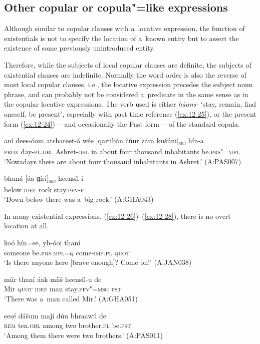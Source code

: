 \subsection{Other copular or copula"=like expressions}
\label{subsec:12-1-4}

 Although similar to copular clauses with a~locative expression, the function of existentials is not to specify the location of a~known entity but to assert the existence of some previously unintroduced entity. 


Therefore, while the subjects of local copular clauses are definite, the subjects of existential clauses are indefinite. Normally the word order is also the reverse of most local copular clauses, i.e., the locative expression precedes the subject noun phrase, and can probably not be considered a~predicate in the same sense as in the copular locative expressions. The verb used is either \textit{háans-} `stay, remain, find oneself, be present', especially with past time reference (\ref{ex:12-25}), or the present form (\ref{ex:12-24})~-- and occasionally the Past form~-- of the standard copula.

\begin{exe}
\ex
\label{ex:12-24}
\gll aní dees-óom atshareet-á wée [qariibán čúur zára kušúni]\textsubscript{\textsc{sbj}} hín-a \\
\textsc{prox} day-\textsc{pl.obl} Ashret-\textsc{obl} in about  four thousand inhabitants be.\textsc{prs"=mpl}\\
\glt `Nowadays there are about four thousand inhabitants in Ashret.' (A:PAS007)

\ex
\label{ex:12-25}
\gll bhuná [áa ɡíri]\textsubscript{\textsc{sbj}} heensíl-i \\
below \textsc{idef} rock stay.\textsc{pfv-f} \\
\glt `Down below there was a~big rock.' (A:GHA043)
\end{exe}

In many existential expressions, (\ref{ex:12-26})--(\ref{ex:12-28}), there is no overt location at all.

\begin{exe}
\ex
\label{ex:12-26}
\gll koó hín=ee, yh-óoi thaní \\
someone be.\textsc{prs.mpl}=\textsc{q} come-\textsc{imp.pl} \textsc{quot} \\
\glt `Is there anyone here [brave enough]? Come on!' (A:JAN038)
\end{exe}
\begin{exe}
\ex
\label{ex:12-27}
\gll miír thaní áak míiš heensíl-u de \\
Mir \textsc{quot} \textsc{idef} man stay.\textsc{pfv"=msg} \textsc{pst} \\
\glt `There was a~man called Mir.' (A:GHA051)
\end{exe}
\begin{exe}
\ex
\label{ex:12-28}
\gll eesé dášum maǰí dúu bhraawú de \\
\textsc{rem} ten.\textsc{obl} among two brother.\textsc{pl} be.\textsc{pst} \\
\glt `Among them there were two brothers.' (A:PAS011)
\end{exe}

